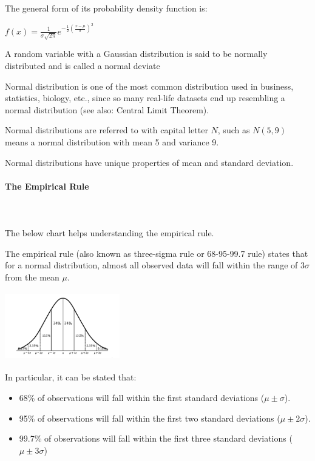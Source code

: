 \documentclass{article}
\begin{document}
The general form of its probability density function is:

$\displaystyle f(x)={\frac {1}{\sigma {\sqrt {2\pi }}}}e^{-{\frac {1}{2}}\left({\frac {x-\mu }{\sigma }}\right)^{2}}$

A random variable with a Gaussian distribution is said to be normally distributed and is called a normal deviate

Normal distribution is one of the most common distribution used in business, statistics, biology, etc., since so many real-life datasets end up resembling a normal distribution (see also: Central Limit Theorem).

Normal distributions are referred to with capital letter $N$, such as $N(5,9)$ means a normal distribution with mean 5 and variance 9.

Normal distributions have unique properties of mean and standard deviation.

\paragraph{The Empirical Rule}\mbox{} \\
\mbox{} \\

The below chart helps understanding the empirical rule.

The empirical rule (also known as three-sigma rule or 68-95-99.7 rule) states that for a normal distribution, almost all observed data will fall within the range of $3 \sigma $ from the mean $ \mu $. 

\includegraphics[width=5cm, height=3cm]{empirical}

In particular, it can be stated that:
\begin{itemize}
    \item 68\% of observations will fall within the first standard deviations ($\mu \pm \sigma $).
    \item 95\% of observations will fall within the first two standard deviations ($\mu \pm 2\sigma $).
    \item 99.7\% of observations will fall within the first three standard deviations ($\mu \pm 3\sigma $)
\end{itemize}
\end{document}
